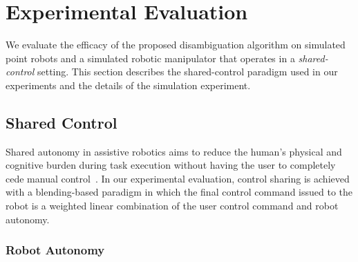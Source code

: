 \documentclass[conference]{IEEEtran}
\begin{document}
\section{Experimental Evaluation}\label{sec:ed}
We evaluate the efficacy of the proposed disambiguation algorithm on simulated point robots and a simulated robotic manipulator that operates in a \textit{shared-control} setting. This section describes the shared-control paradigm used in our experiments and the details of the simulation experiment. 
\subsection{Shared Control}\label{ssec:shared-control}
Shared autonomy in assistive robotics aims to reduce the human's physical and cognitive burden during task execution without having the user to completely cede manual control~\citep{kim2012autonomy, muelling2017autonomy}. 
In our experimental evaluation, control sharing is achieved with a blending-based paradigm in which the final control command issued to the robot is a weighted linear combination of the user control command and robot autonomy.
\subsubsection{Robot Autonomy}\label{sssec:autonomy}
\end{document}
